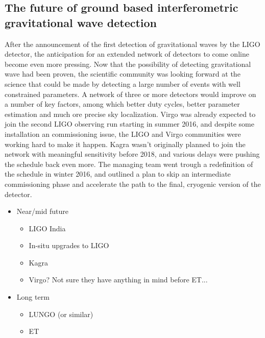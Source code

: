 \subsection{The future of ground based interferometric gravitational wave detection}\label{subsec:future}

After the announcement of the first detection of gravitational waves by the LIGO detector, the anticipation for an extended network of detectors to come online become even more pressing. Now that the possibility of detecting gravitational wave had been proven, the scientific community was looking forward at the science that could be made by detecting a large number of events with well constrained parameters. A network of three or more detectors would improve on a number of key factors, among which better duty cycles, better parameter estimation and much ore precise sky localization.
Virgo was already expected to join the second LIGO observing run starting in summer 2016, and despite some installation an commissioning issue, the LIGO and Virgo communities were working hard to make it happen.
Kagra wasn't originally planned to join the network with meaningful sensitivity before 2018, and various delays were pushing the schedule back even more. The managing team went trough a redefinition of the schedule in winter 2016, and outlined a plan to skip an intermediate commissioning phase and accelerate the path to the final, cryogenic version of the detector.


\begin{itemize}
	\item Near/mid future
	\begin{itemize}
		\item LIGO India
		\item In-situ upgrades to LIGO
		\item Kagra
		\item Virgo? Not sure they have anything in mind before ET...
	\end{itemize}
	\item Long term
	\begin{itemize}
		\item LUNGO (or similar)
		\item ET
	\end{itemize}
\end{itemize}
